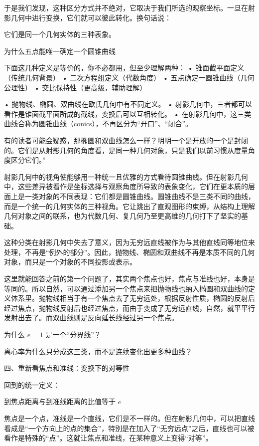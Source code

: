 于是我们发现，这种区分方式并不绝对，它取决于我们所选的观察坐标。一旦在射影几何中进行变换，它们就可以彼此转化。换句话说：

它们是同一个几何实体的三种表象。



	为什么五点能唯一确定一个圆锥曲线


下面这几种定义是等价的，你不必都用，但至少理解两种：
	•	锥面截平面定义（传统几何背景）
	•	二次方程组定义（代数角度）
	•	五点确定一圆锥曲线（几何公理性）
	•	交比保持性（更高级，辅助理解）


	•	抛物线、椭圆、双曲线在欧氏几何中有不同定义。
	•	射影几何中，三者都可以看作是锥面截平面所成的截线，变换后可以互相转化。
	•	在射影几何中，这三类曲线合称为圆锥曲线（conics），不再区分为“开口”、“闭合”。

有的读者可能会疑惑，那椭圆和双曲线怎么一样？明明一个是开放的一个是封闭的。它们是从射影几何的角度看，是同一种几何对象，只是我们以前习惯从度量角度区分它们。”


射影几何中的视角使能够用一种统一且优雅的方式看待圆锥曲线。但在射影几何中，这些差异被看作是坐标选择与观察角度所导致的表象变化，它们在更本质的层面上是一类对象的不同表现：它们都是圆锥曲线。圆锥曲线不是三类不同的曲线，而是一个统一的几何实体的三种视角。它让跳出了直观图形的束缚，从结构上理解几何对象之间的联系，也为代数几何、复几何乃至更高维的几何打下了坚实的基础。

这种分类在射影几何中失去了意义，因为无穷远直线被作为与其他直线同等地位来处理，不再是“例外的部分”。因此，抛物线、椭圆和双曲线不再是本质不同的几何对象，而只是一个对象的不同投影或表示。

这里就能回答之前的第一个问题了，其实两个焦点也好，焦点与准线也好，本身是等同的。所以自然，可以通过添加另一个焦点来把抛物线也纳入椭圆和双曲线的定义体系里。抛物线相当于有一个焦点去了无穷远处，根据反射性质，椭圆的反射后经过焦点，抛物线反射后也经过焦点，而由于变成了无穷远直线，自然，就平平行发射出去了。而双曲线则是反向延长线经过另一个焦点。

为什么 $e=1$ 是一个“分界线”？

离心率为什么只分成这三类，而不是连续变化出更多种曲线？

四、重新看焦点和准线：变换下的对等性

回到的统一定义：

到焦点距离与到准线距离的比值等于 $e$

焦点是一个点，准线是一个直线，它们是不一样的。但在射影几何中，可以把直线看成是“一个方向上的点的集合”，特别是在加入了“无穷远点”之后，直线也可以被看作是特殊的“点”。这就让焦点和准线，在某种意义上变得“对等”。

